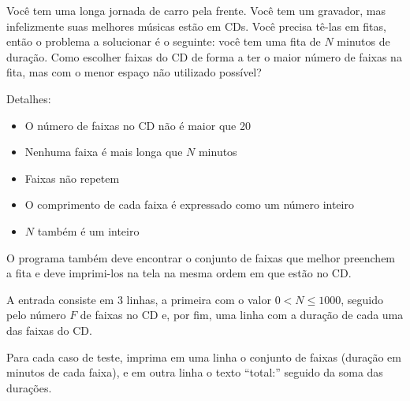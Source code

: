 
%
%
%
%

Você tem uma longa jornada de carro pela frente. Você tem um gravador, mas infelizmente suas melhores músicas estão em CDs. Você precisa tê-las em fitas, então o problema a solucionar é o seguinte: você tem uma fita de $N$ minutos de duração. Como escolher faixas do CD de forma a ter o maior número de faixas na fita, mas com o menor espaço não utilizado possível?

Detalhes:
\begin{itemize}
	\item O número de faixas no CD não é maior que 20
	\item Nenhuma faixa é mais longa que $N$ minutos
	\item Faixas não repetem
	\item O comprimento de cada faixa é expressado como um número inteiro
	\item $N$ também é um inteiro
\end{itemize}

O programa também deve encontrar o conjunto de faixas que melhor preenchem a fita e deve imprimi-los na tela na mesma ordem em que estão no CD.

\Entrada%
A entrada consiste em 3 linhas, a primeira com o valor $0 < N \leq 1000$, seguido pelo número $F$ de faixas no CD e, por fim, uma linha com a duração de cada uma das faixas do CD.

\Saida%
Para cada caso de teste, imprima em uma linha o conjunto de faixas (duração em
minutos de cada faixa), e em outra linha o texto ``total:'' seguido da soma das durações.

%
